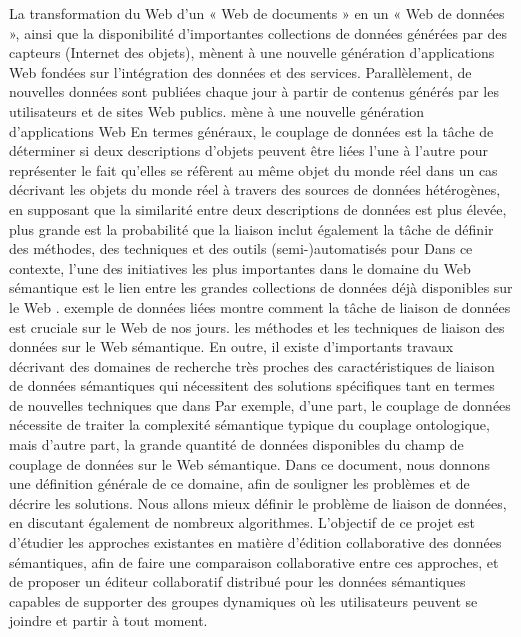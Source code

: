 \documentclass[12pt]{report}
\begin{document}
La transformation du Web d’un « Web de documents » en un « Web de données », ainsi que la disponibilité d’importantes collections de données générées par des capteurs (Internet des objets), mènent à une nouvelle génération d’applications Web fondées sur l’intégration des données et des services. Parallèlement, de nouvelles données sont publiées chaque jour à partir de contenus générés par les utilisateurs et de sites Web publics. mène à une nouvelle génération d’applications Web En termes généraux, le couplage de données est la tâche de déterminer si deux descriptions d’objets peuvent être liées l’une à l’autre pour représenter le fait qu’elles se réfèrent au même objet du monde réel dans un cas décrivant les objets du monde réel à travers des sources de données hétérogènes, en supposant que la similarité entre deux descriptions de données est plus élevée, plus grande est la probabilité que la liaison inclut également la tâche de définir des méthodes, des techniques et des outils (semi-)automatisés pour Dans ce contexte, l’une des initiatives les plus importantes dans le domaine du Web sémantique est le lien entre les grandes collections de données déjà disponibles sur le Web \cite{LDOW}. exemple de données liées montre comment la tâche de liaison de données est cruciale sur le Web de nos jours. les méthodes et les techniques de liaison des données sur le Web sémantique. En outre, il existe d’importants travaux décrivant des domaines de recherche très proches des caractéristiques de liaison de données sémantiques qui nécessitent des solutions spécifiques tant en termes de nouvelles techniques que dans Par exemple, d’une part, le couplage de données nécessite de traiter la complexité sémantique typique du couplage ontologique, mais d’autre part, la grande quantité de données disponibles du champ de couplage de données sur le Web sémantique. Dans ce document, nous donnons une définition générale de ce domaine, afin de souligner les problèmes et de décrire les solutions. Nous allons mieux définir le problème de liaison de données, en discutant également de nombreux algorithmes. L’objectif de ce projet est d’étudier les approches existantes en matière d’édition collaborative des données sémantiques, afin de faire une comparaison collaborative entre ces approches, et de proposer un éditeur collaboratif distribué pour les données sémantiques capables de supporter des groupes dynamiques où les utilisateurs peuvent se joindre et partir à tout moment.\cite{WLD}
\end{document}
